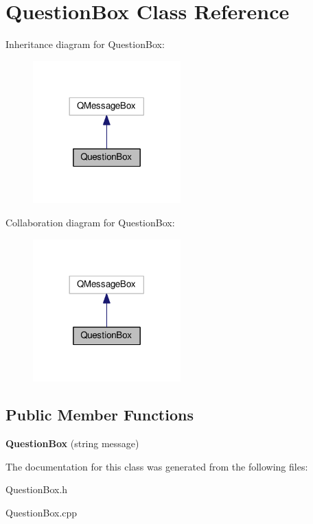 \hypertarget{classQuestionBox}{}\section{Question\+Box Class Reference}
\label{classQuestionBox}


Inheritance diagram for Question\+Box\+:\nopagebreak
\begin{figure}[H]
\begin{center}
\leavevmode
\includegraphics[width=161pt]{classQuestionBox__inherit__graph}
\end{center}
\end{figure}


Collaboration diagram for Question\+Box\+:\nopagebreak
\begin{figure}[H]
\begin{center}
\leavevmode
\includegraphics[width=161pt]{classQuestionBox__coll__graph}
\end{center}
\end{figure}
\subsection*{Public Member Functions}
\begin{DoxyCompactItemize}
\item 
\mbox{\label{classQuestionBox_abe8853e77a48536473fdf35162b91bcd}} 
{\bfseries Question\+Box} (string message)
\end{DoxyCompactItemize}


The documentation for this class was generated from the following files\+:\begin{DoxyCompactItemize}
\item 
Question\+Box.\+h\item 
Question\+Box.\+cpp\end{DoxyCompactItemize}
